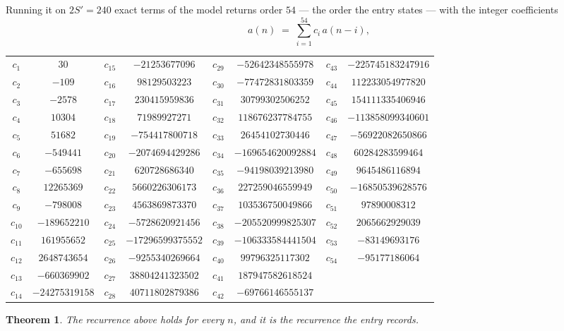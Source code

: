 \documentclass[11pt,a4paper]{article}
\theoremstyle{plain}
\newtheorem{theorem}{Theorem}
\theoremstyle{definition}
\begin{document}
Running it on $2S'=240$ exact terms of the model returns order $54$ --- the order the
entry states --- with the integer coefficients
\[
a(n)\;=\;\sum_{i=1}^{54}c_i\,a(n-i),
\]
\begin{center}\small
\begin{tabular}{cccccccc}
$c_{1}$ & $30$ & $c_{15}$ & $-21253677096$ & $c_{29}$ & $-52642348555978$ & $c_{43}$ & $-225745183247916$ \\
$c_{2}$ & $-109$ & $c_{16}$ & $98129503223$ & $c_{30}$ & $-77472831803359$ & $c_{44}$ & $112233054977820$ \\
$c_{3}$ & $-2578$ & $c_{17}$ & $230415959836$ & $c_{31}$ & $30799302506252$ & $c_{45}$ & $154111335406946$ \\
$c_{4}$ & $10304$ & $c_{18}$ & $71989927271$ & $c_{32}$ & $118676237784755$ & $c_{46}$ & $-113858099340601$ \\
$c_{5}$ & $51682$ & $c_{19}$ & $-754417800718$ & $c_{33}$ & $26454102730446$ & $c_{47}$ & $-56922082650866$ \\
$c_{6}$ & $-549441$ & $c_{20}$ & $-2074694429286$ & $c_{34}$ & $-169654620092884$ & $c_{48}$ & $60284283599464$ \\
$c_{7}$ & $-655698$ & $c_{21}$ & $620728686340$ & $c_{35}$ & $-94198039213980$ & $c_{49}$ & $9645486116894$ \\
$c_{8}$ & $12265369$ & $c_{22}$ & $5660226306173$ & $c_{36}$ & $227259046559949$ & $c_{50}$ & $-16850539628576$ \\
$c_{9}$ & $-798008$ & $c_{23}$ & $4563869873370$ & $c_{37}$ & $103536750049866$ & $c_{51}$ & $97890008312$ \\
$c_{10}$ & $-189652210$ & $c_{24}$ & $-5728620921456$ & $c_{38}$ & $-205520999825307$ & $c_{52}$ & $2065662929039$ \\
$c_{11}$ & $161955652$ & $c_{25}$ & $-17296599375552$ & $c_{39}$ & $-106333584441504$ & $c_{53}$ & $-83149693176$ \\
$c_{12}$ & $2648743654$ & $c_{26}$ & $-9255340269664$ & $c_{40}$ & $99796325117302$ & $c_{54}$ & $-95177186064$ \\
$c_{13}$ & $-660369902$ & $c_{27}$ & $38804241323502$ & $c_{41}$ & $187947582618524$ &  &  \\
$c_{14}$ & $-24275319158$ & $c_{28}$ & $40711802879386$ & $c_{42}$ & $-69766146555137$ &  &  \\
\end{tabular}
\end{center}

\begin{theorem}
The recurrence above holds for every $n$, and it is the recurrence the entry records.
\end{theorem}
\end{document}
